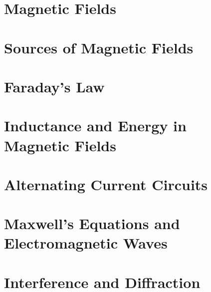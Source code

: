 \section{Magnetic Fields}
\section{Sources of Magnetic Fields}
\section{Faraday's Law}
\section{Inductance and Energy in Magnetic Fields}
\section{Alternating Current Circuits}
\section{Maxwell's Equations and Electromagnetic Waves}
\section{Interference and Diffraction}


